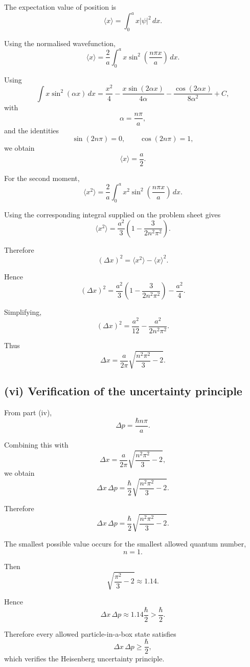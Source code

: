 \documentclass[11pt,a4paper]{article}
\begin{document}
The expectation value of position is
\[
\langle x\rangle
=
\int_0^a x|\psi|^2\,dx.
\]

Using the normalised wavefunction,
\[
\langle x\rangle
=
\frac2a
\int_0^a
x\sin^2\left(\frac{n\pi x}{a}\right)\,dx.
\]

Using
\[
\int x\sin^2(\alpha x)\,dx
=
\frac{x^2}{4}
-\frac{x\sin(2\alpha x)}{4\alpha}
-\frac{\cos(2\alpha x)}{8\alpha^2}
+C,
\]
with
\[
\alpha=\frac{n\pi}{a},
\]
and the identities
\[
\sin(2n\pi)=0,
\qquad
\cos(2n\pi)=1,
\]
we obtain
\[
\boxed{\langle x\rangle=\frac a2}.
\]

For the second moment,
\[
\langle x^2\rangle
=
\frac2a
\int_0^a
x^2\sin^2\left(\frac{n\pi x}{a}\right)\,dx.
\]

Using the corresponding integral supplied on the problem sheet gives
\[
\boxed{
\langle x^2\rangle
=
\frac{a^2}{3}
\left(
1-\frac{3}{2n^2\pi^2}
\right)
}.
\]

Therefore
\[
(\Delta x)^2
=
\langle x^2\rangle-\langle x\rangle^2.
\]

Hence
\[
(\Delta x)^2
=
\frac{a^2}{3}
\left(
1-\frac{3}{2n^2\pi^2}
\right)
-\frac{a^2}{4}.
\]

Simplifying,
\[
(\Delta x)^2
=
\frac{a^2}{12}
-\frac{a^2}{2n^2\pi^2}.
\]

Thus
\[
\boxed{
\Delta x
=
\frac{a}{2\pi}
\sqrt{\frac{n^2\pi^2}{3}-2}
}.
\]

\subsection{(vi) Verification of the uncertainty principle}

From part (iv),
\[
\Delta p
=
\frac{\hbar n\pi}{a}.
\]

Combining this with
\[
\Delta x
=
\frac{a}{2\pi}
\sqrt{\frac{n^2\pi^2}{3}-2},
\]
we obtain
\[
\Delta x\,\Delta p
=
\frac{\hbar}{2}
\sqrt{\frac{n^2\pi^2}{3}-2}.
\]

Therefore
\[
\boxed{
\Delta x\,\Delta p
=
\frac{\hbar}{2}
\sqrt{\frac{n^2\pi^2}{3}-2}
}.
\]

The smallest possible value occurs for the smallest allowed quantum number,
\[
n=1.
\]

Then
\[
\sqrt{\frac{\pi^2}{3}-2}
\approx1.14.
\]

Hence
\[
\Delta x\,\Delta p
\approx1.14\frac{\hbar}{2}
>
\frac{\hbar}{2}.
\]

Therefore every allowed particle-in-a-box state satisfies
\[
\boxed{
\Delta x\,\Delta p\ge\frac{\hbar}{2}
},
\]
which verifies the Heisenberg uncertainty principle.
\end{document}
